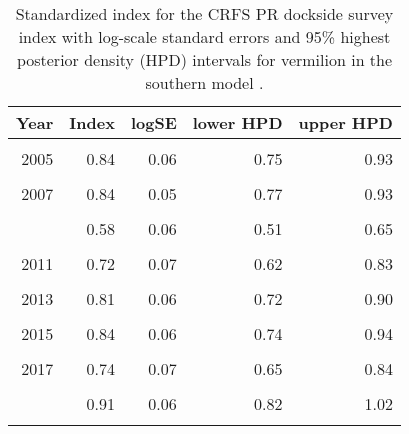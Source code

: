\documentclass[
]{article}
\begin{document}
\begin{table}

\caption{\label{tab:tab-index-crfspr}Standardized index for the CRFS PR dockside survey index with log-scale standard errors and 95\% highest
       posterior density (HPD) intervals for vermilion in the southern model .}
\centering
\begin{tabular}[t]{rrrrr}
\toprule
Year & Index & logSE & lower HPD & upper HPD\\
\midrule
\cellcolor{gray!6}{2004} & \cellcolor{gray!6}{1.36} & \cellcolor{gray!6}{0.05} & \cellcolor{gray!6}{1.23} & \cellcolor{gray!6}{1.49}\\
2005 & 0.84 & 0.06 & 0.75 & 0.93\\
\cellcolor{gray!6}{2006} & \cellcolor{gray!6}{0.80} & \cellcolor{gray!6}{0.05} & \cellcolor{gray!6}{0.72} & \cellcolor{gray!6}{0.89}\\
2007 & 0.84 & 0.05 & 0.77 & 0.93\\
\cellcolor{gray!6}{2008} & \cellcolor{gray!6}{0.67} & \cellcolor{gray!6}{0.05} & \cellcolor{gray!6}{0.60} & \cellcolor{gray!6}{0.74}\\
\addlinespace
2009 & 0.58 & 0.06 & 0.51 & 0.65\\
\cellcolor{gray!6}{2010} & \cellcolor{gray!6}{0.61} & \cellcolor{gray!6}{0.07} & \cellcolor{gray!6}{0.53} & \cellcolor{gray!6}{0.70}\\
2011 & 0.72 & 0.07 & 0.62 & 0.83\\
\cellcolor{gray!6}{2012} & \cellcolor{gray!6}{0.69} & \cellcolor{gray!6}{0.07} & \cellcolor{gray!6}{0.60} & \cellcolor{gray!6}{0.80}\\
2013 & 0.81 & 0.06 & 0.72 & 0.90\\
\addlinespace
\cellcolor{gray!6}{2014} & \cellcolor{gray!6}{0.85} & \cellcolor{gray!6}{0.06} & \cellcolor{gray!6}{0.76} & \cellcolor{gray!6}{0.95}\\
2015 & 0.84 & 0.06 & 0.74 & 0.94\\
\cellcolor{gray!6}{2016} & \cellcolor{gray!6}{0.73} & \cellcolor{gray!6}{0.07} & \cellcolor{gray!6}{0.64} & \cellcolor{gray!6}{0.83}\\
2017 & 0.74 & 0.07 & 0.65 & 0.84\\
\cellcolor{gray!6}{2018} & \cellcolor{gray!6}{0.65} & \cellcolor{gray!6}{0.07} & \cellcolor{gray!6}{0.56} & \cellcolor{gray!6}{0.74}\\
\addlinespace
2019 & 0.91 & 0.06 & 0.82 & 1.02\\
\cellcolor{gray!6}{2020} & \cellcolor{gray!6}{0.77} & \cellcolor{gray!6}{0.17} & \cellcolor{gray!6}{0.55} & \cellcolor{gray!6}{1.05}\\
\bottomrule
\end{tabular}
\end{table}
\end{document}
